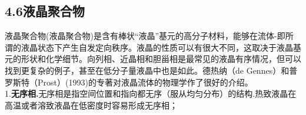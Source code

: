\subsection{4.6液晶聚合物}

液晶聚合物(液晶聚合物)是含有棒状“液晶”基元的高分子材料，能够在流体-即所谓的液晶状态下产生自发定向秩序。液晶的性质可以有很大不同，这取决于液晶基元的形状和化学细节。向列相、近晶相和胆甾相是最常见的液晶有序情况，但可以找到更复杂的例子，甚至在低分子量液晶中也是如此。德热纳（de Gennes）和普罗斯特（Prost）(1993)的专著对液晶流体的物理学作了很好的介绍。\\

1.\textbf{无序相.}无序相是指空间位置和指向都无序（服从均匀分布）的结构.热致液晶在高温或者溶致液晶在低密度时容易形成无序相；\\

